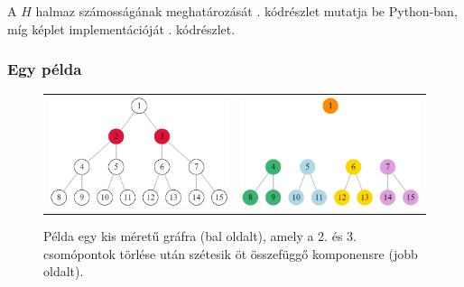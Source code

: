 A $H$ halmaz számosságának meghatározását . kódrészlet mutatja be Python-ban,
míg  képlet implementációját . kódrészlet.


\subsubsection{Egy példa}

\begin{figure}[h]
  \centering
  \begin{tabular}{ll}
    \includegraphics[scale=0.4]{images/bocndp_before.png}
     &
    \includegraphics[scale=0.4]{images/bocndp_after.png}
  \end{tabular}
  \caption{
    Példa egy kis méretű gráfra (bal oldalt), amely a 2. és 3. csomópontok törlése után
    szétesik öt összefüggő komponensre (jobb oldalt).
  }
  \label{fig:BOCNDP_EXAMPLE}
\end{figure}




